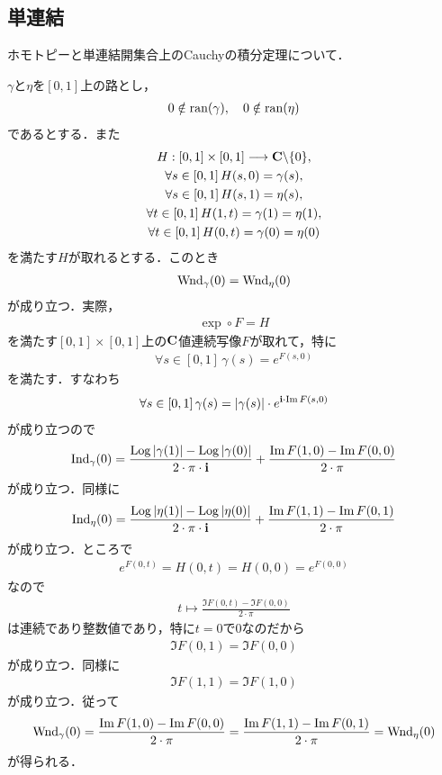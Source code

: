 \subsection{単連結}
	ホモトピーと単連結開集合上のCauchyの積分定理について．
	
	$\gamma$と$\eta$を$[0,1]$上の路とし，
	\begin{align}
		0 \notin \operatorname*{ran} (\gamma),\quad 0 \notin \operatorname*{ran} (\eta)
	\end{align}
	であるとする．また
	\begin{align}
		\begin{gathered}
		H:[0,1] \times [0,1] \longrightarrow \mathbf{C} \backslash \{0\}, \\
		\forall s \in [0,1]\, H(s,0) = \gamma(s), \\
		\forall s \in [0,1]\, H(s,1) = \eta(s), \\
		\forall t \in [0,1]\, H(1,t) = \gamma(1) = \eta(1), \\
		\forall t \in [0,1]\, H(0,t) = \gamma(0) = \eta(0)
		\end{gathered}
	\end{align}
	を満たす$H$が取れるとする．このとき
	\begin{align}
		\operatorname{Wnd}_{\gamma}(0) = \operatorname{Wnd}_{\eta}(0)
	\end{align}
	が成り立つ．実際，
	\begin{align}
		\exp \circ F = H
	\end{align}
	を満たす$[0,1] \times [0,1]$上の$\mathbf{C}$値連続写像$F$が取れて，特に
	\begin{align}
		\forall s \in [0,1]\, \gamma(s) = e^{F(s,0)}
	\end{align}
	を満たす．すなわち
	\begin{align}
		\forall s \in [0,1]\, \gamma(s) = |\gamma(s)| \cdot e^{\mathbf{i} \cdot \operatorname{Im} F(s,0)}
	\end{align}
	が成り立つので
	\begin{align}
		\operatorname{Ind}_{\gamma}(0)
		= \frac{\operatorname{Log}{|\gamma(1)|} - \operatorname{Log}{|\gamma(0)|}}{2\cdot\pi\cdot\mathbf{i}}
		+ \frac{\operatorname{Im} F(1,0) - \operatorname{Im} F(0,0)}{2\cdot\pi}
	\end{align}
	が成り立つ．同様に
	\begin{align}
		\operatorname{Ind}_{\eta}(0)
		= \frac{\operatorname{Log}{|\eta(1)|} - \operatorname{Log}{|\eta(0)|}}{2\cdot\pi\cdot\mathbf{i}}
		+ \frac{\operatorname{Im} F(1,1) - \operatorname{Im} F(0,1)}{2\cdot\pi}
	\end{align}
	が成り立つ．ところで
	\begin{align}
		e^{F(0,t)} = H(0,t) = H(0,0) = e^{F(0,0)}
	\end{align}
	なので
	\begin{align}
		t \longmapsto \frac{\Im{F(0,t)} - \Im{F(0,0)}}{2\cdot\pi}
	\end{align}
	は連続であり整数値であり，特に$t=0$で$0$なのだから
	\begin{align}
		\Im{F(0,1)} = \Im{F(0,0)}
	\end{align}
	が成り立つ．同様に
	\begin{align}
		\Im{F(1,1)} = \Im{F(1,0)}
	\end{align}
	が成り立つ．従って
	\begin{align}
		\operatorname{Wnd}_{\gamma}(0) = \frac{\operatorname{Im} F(1,0) - \operatorname{Im} F(0,0)}{2\cdot\pi}
		= \frac{\operatorname{Im} F(1,1) - \operatorname{Im} F(0,1)}{2\cdot\pi}
		= \operatorname{Wnd}_{\eta}(0)
	\end{align}
	が得られる．